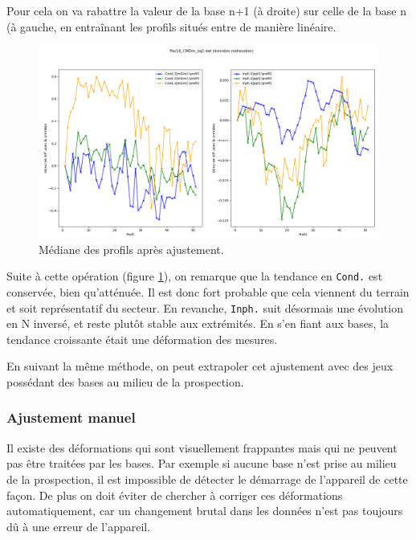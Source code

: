 \documentclass[12pt]{article}
\begin{document}
    Pour cela on va rabattre la valeur de la base n+1 (à droite) sur celle de la base n (à gauche, en entraînant les profils situés entre de manière linéaire.

    \newpage
    \begin{figure}[ht!]
        \centering
        \includegraphics[width=\textwidth]{Images/Base_diff_Apres_sq2.png}  
        \caption{Médiane des profils après ajustement.}
        \label{fig:2_evol_base_im}
    \end{figure}

    Suite à cette opération (figure \ref{fig:2_evol_base_im}), on remarque que la tendance en \texttt{Cond.} est conservée, bien qu'atténuée. Il est donc fort probable que cela viennent du terrain et soit représentatif du secteur. En revanche, \texttt{Inph.} suit désormais une évolution en N inversé, et reste plutôt stable aux extrémités. En s'en fiant aux bases, la tendance croissante était une déformation des mesures.

    En suivant la même méthode, on peut extrapoler cet ajustement avec des jeux possédant des bases au milieu de la prospection.

\subsubsection{Ajustement manuel}

    Il existe des déformations qui sont visuellement frappantes mais qui ne peuvent pas être traitées par les bases. Par exemple si aucune base n'est prise au milieu de la prospection, il est impossible de détecter le démarrage de l'appareil de cette façon. De plus on doit éviter de chercher à corriger ces déformations automatiquement, car un changement brutal dans les données n'est pas toujours dû à une erreur de l'appareil.
\end{document}
